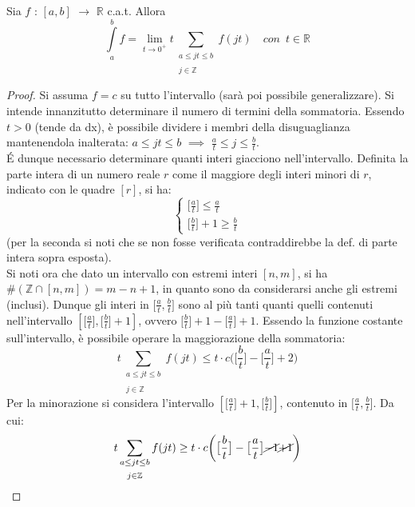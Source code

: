 \documentclass[10pt, oneside]{book}
\theoremstyle{plain}
\begin{document}
\begin{lem}
    Sia $f$ : $[a,b]$ $\rightarrow$ $\mathbb{R}$ c.a.t. Allora
    \[\int\limits_{a}^{b} f = \lim\limits_{t \rightarrow 0^+} t \sum_{\substack{a \leq jt \leq b \\~\\ j \in \mathbb{Z}}} f(jt) \quad con \enspace t \in \mathbb{R}\]
\end{lem}
\begin{proof}
    Si assuma $f = c$ su tutto l'intervallo (sarà poi possibile generalizzare).
    Si intende innanzitutto determinare il numero di termini della sommatoria. Essendo $t > 0$ (tende da dx), è possibile dividere i membri della disuguaglianza mantenendola inalterata: $a \leq jt \leq b$ $\implies$ $\frac{a}{t} \leq j \leq \frac{b}{t}$.
    \\\'E dunque necessario determinare quanti interi giacciono nell'intervallo. Definita la parte intera di un numero reale $r$ come il maggiore degli interi minori di $r$, indicato con le quadre $[r]$, si ha:
    \[\begin{cases}
        \big[\frac{a}{t}\big] \leq \frac{a}{t}\\
        \big[\frac{b}{t}\big] + 1 \geq \frac{b}{t}
    \end{cases}\]
    (per la seconda si noti che se non fosse verificata contraddirebbe la def. di parte intera sopra esposta).
    \\Si noti ora che dato un intervallo con estremi interi $[n, m]$, si ha $\#(\mathbb{Z} \cap [n,m]) = m - n + 1$, in quanto sono da considerarsi anche gli estremi (inclusi). Dunque gli interi in $\big[\frac{a}{t}, \frac{b}{t}\big]$ sono al più tanti quanti quelli contenuti nell'intervallo $[\big[\frac{a}{t}\big], \big[\frac{b}{t}\big] + 1]$, ovvero $\big[\frac{b}{t}\big] + 1 - \big[\frac{a}{t}\big] + 1$. Essendo la funzione costante sull'intervallo, è possibile operare la maggiorazione della sommatoria:
    \[t \sum_{\substack{a \leq jt \leq b \\~\\ j \in \mathbb{Z}}} f(jt) \leq t \cdot c \bigg(\big[\frac{b}{t}\big] - \big[\frac{a}{t}\big] + 2\bigg)\]
    Per la minorazione si considera l'intervallo $[\big[\frac{a}{t}\big] + 1, \big[\frac{b}{t}\big]]$, contenuto in $\big[\frac{a}{t}, \frac{b}{t}\big]$. Da cui:
    \[t \sum_{\substack{a \leq jt \leq b \\~\\ j \in \mathbb{Z}}} f(jt) \geq t \cdot c \bigg(\big[\frac{b}{t}\big] - \big[\frac{a}{t}\big] \cancel{-1} \cancel{+1}\bigg)\]

\end{proof}
\end{document}
